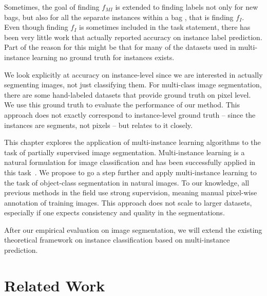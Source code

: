 Sometimes, the goal of finding $f_{MI}$ is extended to finding labels not only
for new bags, but also for all the separate instances within a bag
\citep{liconvex2010,zha2008joint}, that is finding $f_{I}$.\\ 
Even though finding $f_{I}$ is sometimes included in the task statement, there
has been very little work that actually reported accuracy on instance label
prediction. Part of the reason for this might be that for many of the datasets
used in multi-instance learning no ground truth for instances exists.

We look explicitly at accuracy on instance-level since we are interested in
actually segmenting images, not just classifying them. For multi-class image
segmentation, there are some hand-labeled datasets that provide ground truth
on pixel level. We use this ground truth to evaluate the performance of our
method. This approach does not exactly correspond to instance-level ground truth --
since the instances are segments, not pixels -- but relates to it closely.


This chapter explores the 
application of multi-instance learning algorithms to the task of partially supervised image segmentation.
Multi-instance learning is a natural formulation for image classification and has been
successfully applied in this task~\citep{zhou2007multi}. We propose to go a step further and apply
multi-instance learning to the task of object-class segmentation in natural
images.
To our knowledge, all previous methods in the field use strong
supervision, meaning manual pixel-wise annotation of training images. This
approach does not scale to larger datasets, especially if one expects
consistency and quality in the segmentations.

After our empirical evaluation on image segmentation, we will extend the existing theoretical framework
on instance classification based on multi-instance prediction.

\section{Related Work}
